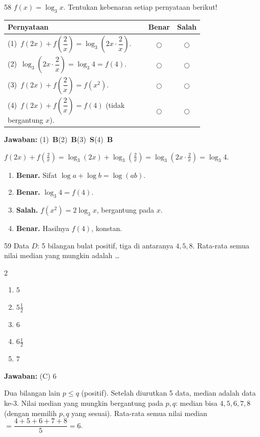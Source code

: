 \documentclass[11pt]{article}
\newcommand{\jawaban}[1]{%
  \noindent\colorbox{gold!30}{\parbox{\dimexpr\linewidth-2\fboxsep\relax}{%
    \textbf{Jawaban:} #1}}\par\smallskip}
\newenvironment{pilB}{%
  \par\smallskip\begin{multicols}{2}
  \begin{enumerate}[label=(\Alph*),leftmargin=*,itemsep=1pt,topsep=3pt]}%
  {\end{enumerate}\end{multicols}}
\begin{document}
\begin{soal}{58}
$f(x)=\log_3 x$.
Tentukan kebenaran setiap pernyataan berikut!

\par\smallskip
{\renewcommand{\arraystretch}{1.4}%
\begin{tabular}{@{}p{0.76\linewidth}cc@{}}
\hline\textbf{Pernyataan}&\textbf{Benar}&\textbf{Salah}\\\hline
(1)~$f(2x)+f\!\left(\dfrac{2}{x}\right)=\log_3\!\left(2x\cdot\dfrac{2}{x}\right)$.&$\bigcirc$&$\bigcirc$\\
(2)~$\log_3\!\left(2x\cdot\dfrac{2}{x}\right)=\log_3 4=f(4)$.&$\bigcirc$&$\bigcirc$\\
(3)~$f(2x)+f\!\left(\dfrac{2}{x}\right)=f(x^2)$.&$\bigcirc$&$\bigcirc$\\
(4)~$f(2x)+f\!\left(\dfrac{2}{x}\right)=f(4)$ (tidak bergantung $x$).&$\bigcirc$&$\bigcirc$\\\hline
\end{tabular}}
\end{soal}
\begin{pembox}
\jawaban{(1)~\textbf{B}\quad(2)~\textbf{B}\quad(3)~\textbf{S}\quad(4)~\textbf{B}}
$f(2x)+f\!\left(\tfrac2x\right)=\log_3(2x)+\log_3\!\left(\tfrac2x\right)=\log_3\!\left(2x\cdot\tfrac2x\right)=\log_3 4$.
\begin{enumerate}[leftmargin=*,topsep=2pt,itemsep=2pt]
\item \textbf{Benar.} Sifat $\log a+\log b=\log(ab)$.
\item \textbf{Benar.} $\log_3 4=f(4)$.
\item \textbf{Salah.} $f(x^2)=2\log_3 x$, bergantung pada $x$.
\item \textbf{Benar.} Hasilnya $f(4)$, konstan.
\end{enumerate}
\end{pembox}

\begin{soal}{59}
Data $D$: 5 bilangan bulat positif, tiga di antaranya $4,5,8$.
Rata-rata semua nilai median yang mungkin adalah \ldots
\begin{pilB}\item $5$\item $5\tfrac12$\item $6$\item $6\tfrac12$\item $7$\end{pilB}
\end{soal}
\begin{pembox}
\jawaban{(C) $6$}
Dua bilangan lain $p\leq q$ (positif). Setelah diurutkan 5 data, median adalah data ke-3.
Nilai median yang mungkin bergantung pada $p,q$:
median bisa $4,5,6,7,8$ (dengan memilih $p,q$ yang sesuai).
Rata-rata semua nilai median $=\dfrac{4+5+6+7+8}{5}=6$.
\end{pembox}
\end{document}
